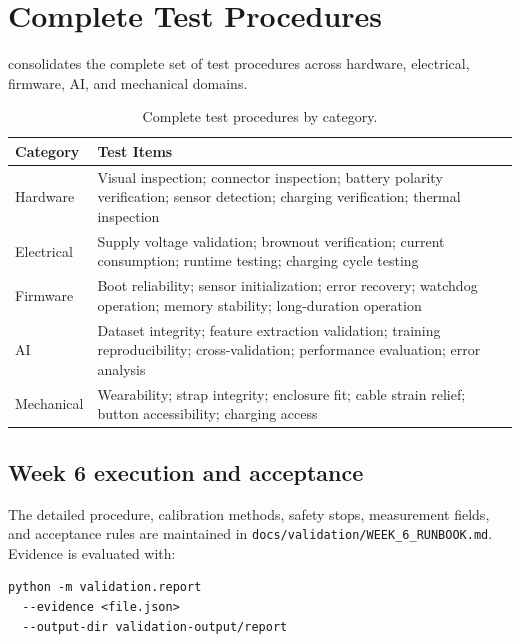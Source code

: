 \section{Complete Test Procedures}
\label{sec:complete-test-procedures}

 consolidates the complete set of test procedures across hardware, electrical, firmware, AI, and mechanical domains.

\begin{table}[t]
\centering
\caption{Complete test procedures by category.}
\label{tab:complete-test-procedures}
\small
\begin{tabularx}{\textwidth}{@{}l Y@{}}
\toprule
\textbf{Category} & \textbf{Test Items} \\
\midrule
Hardware & Visual inspection; connector inspection; battery polarity verification; sensor detection; charging verification; thermal inspection \\
Electrical & Supply voltage validation; brownout verification; current consumption; runtime testing; charging cycle testing \\
Firmware & Boot reliability; sensor initialization; error recovery; watchdog operation; memory stability; long-duration operation \\
AI & Dataset integrity; feature extraction validation; training reproducibility; cross-validation; performance evaluation; error analysis \\
Mechanical & Wearability; strap integrity; enclosure fit; cable strain relief; button accessibility; charging access \\
\bottomrule
\end{tabularx}
\end{table}

\subsection{Week 6 execution and acceptance}

The detailed procedure, calibration methods, safety stops, measurement fields, and acceptance rules are maintained in \texttt{docs/validation/WEEK\_6\_RUNBOOK.md}. Evidence is evaluated with:

\begin{verbatim}
python -m validation.report
  --evidence <file.json>
  --output-dir validation-output/report
\end{verbatim}

